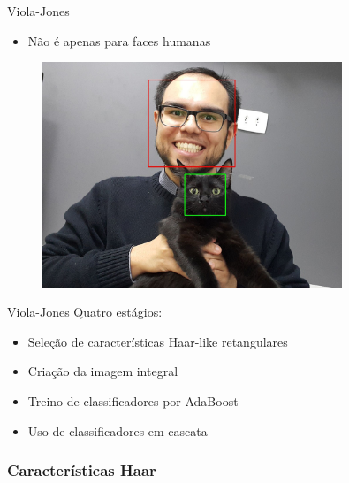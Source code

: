 \begin{frame}{Viola-Jones}
\begin{itemize}
    \item Não é apenas para faces humanas
\end{itemize}

\begin{figure}
    \centering
    \includegraphics[width=0.8\textwidth]{imagens/detecta_joca.jpg}
\end{figure}
\end{frame}

\begin{frame}{Viola-Jones}
Quatro estágios:
\medskip
\begin{itemize}
    \item Seleção de características Haar-like retangulares
    \item Criação da imagem integral
    \item Treino de classificadores por AdaBoost
    \item Uso de classificadores em cascata
\end{itemize}
\end{frame}


\subsubsection{Características Haar}

